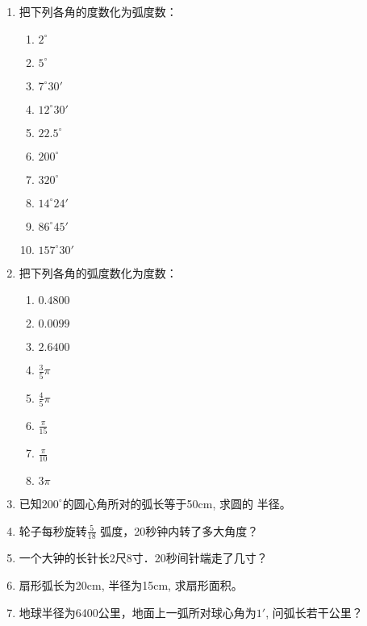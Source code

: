\begin{ex}
\begin{enumerate}
    \item 把下列各角的度数化为弧度数：
\begin{multicols}{3}
    \begin{enumerate}
    \item $2^{\circ}$
    \item $5^{\circ}$
    \item $7^{\circ}30'$
    \item $12^{\circ}30'$
    \item $22.5^{\circ}$
    \item $200^{\circ}$
    \item $320^{\circ}$
    \item $14^{\circ}24'$
    \item $86^{\circ}45'$
    \item  $157^{\circ}30'$
\end{enumerate}
\end{multicols}

\item 把下列各角的弧度数化为度数：
 \begin{multicols}{3}
    \begin{enumerate}
        \item $0.4800$
        \item $0.0099$ 
        \item $2.6400$
        \item $\frac{3}{5}\pi$
        \item $\frac{4}{5}\pi$
        \item $\frac{\pi}{15}$
        \item $\frac{\pi}{10}$
        \item $3\pi$
\end{enumerate}
\end{multicols}

\item 已知$200^{\circ}$的圆心角所对的弧长等于50cm, 求圆的
半径。
\item 轮子每秒旋转$\frac{5}{18}$
弧度，20秒钟内转了多大角度？
\item 一个大钟的长针长2尺8寸．20秒间针端走了几寸？
\item 扇形弧长为20cm, 半径为15cm, 求扇形面积。
\item 地球半径为6400公里，地面上一弧所对球心角为$1'$,
问弧长若干公里？
\end{enumerate}
\end{ex}

